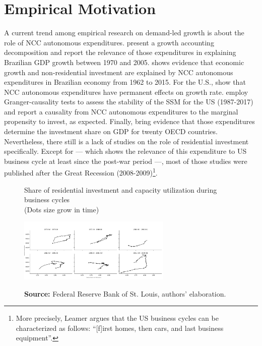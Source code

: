 \documentclass[11pt]{article}
\begin{document}
\section{Empirical Motivation}
\label{sec:org72efba4}
\label{sec:empirical}

A current trend among empirical research on demand-led growth is about the role of NCC autonomous expenditures.
\textcite{freitas_pattern_2013} present a growth accounting decomposition and report the relevance of those expenditures in explaining Brazilian GDP growth between 1970 and 2005. \textcite{braga_investment_2018} shows evidence that economic growth and non-residential investment are explained by NCC autonomous expenditures in Brazilian economy from 1962 to 2015. For the U.S., \textcite{girardi_long-run_2016} show that NCC autonomous expenditures have permanent effects on growth rate. 
\textcite{haluska_growth_2019} employ Granger-causality tests to assess the stability of the SSM for the US (1987-2017) and report a causality from NCC autonomous expenditures to the marginal propensity to invest, as expected.
Finally, \textcite{girardi_autonomous_2018} bring evidence that those expenditures determine the investment share on GDP for twenty OECD countries. 
Nevertheless, there still is a lack of studies on the role of residential investment specifically. 
Except for \textcites{green_follow_1997}{leamer_housing_2007} ---  which shows the relevance of this expenditure to US business cycle at least since the
post-war period ---, most of those studies were published after the Great Recession (2008-2009)\footnote{More precisely, Leamer \textcite[p.~8]{leamer_housing_2007} argues that the US business cycles can be characterized as follows: ``[f]irst homes, then cars, and last business equipment''.}.



\begin{figure}[htb]
    \centering
        \caption{Share of residential investment and capacity utilization during business cycles\\\centering (Dots size grow in  time)} 
    \includegraphics[width = 0.65\textwidth]{./figs/cycles.png}
    \label{fig:cycles}
    \caption*{\textbf{Source:} Federal Reserve Bank of St. Louis, authors’ elaboration.}
\end{figure}
\end{document}
